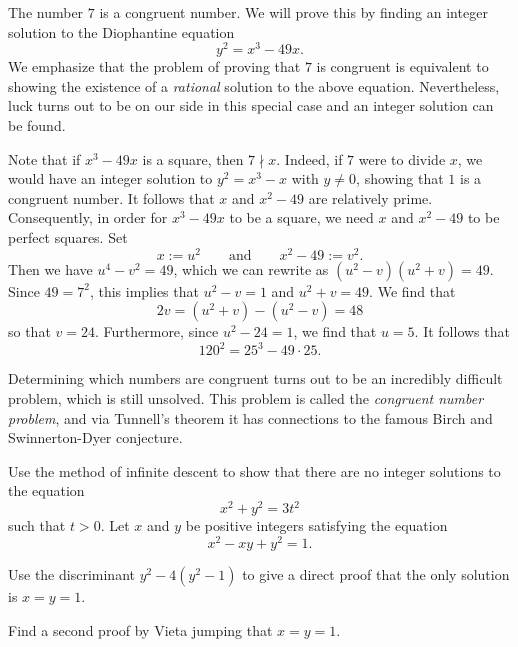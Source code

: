 \begin{example}
  The number $7$ is a congruent number. We will prove this by finding an integer solution to the Diophantine equation
  \begin{equation*}
    y^2=x^3-49x.
  \end{equation*}
  We emphasize that the problem of proving that $7$ is congruent is equivalent to showing the existence of a \emph{rational} solution to the above equation. Nevertheless, luck turns out to be on our side in this special case and an integer solution can be found.
  
  Note that if $x^3-49x$ is a square, then $7\nmid x$. Indeed, if $7$ were to divide $x$, we would have an integer solution to $y^2=x^3-x$ with $y\neq 0$, showing that $1$ is a congruent number. It follows that $x$ and $x^2-49$ are relatively prime. Consequently, in order for $x^3-49x$ to be a square, we need $x$ and $x^2-49$ to be perfect squares. Set
  \begin{equation*}
    x:=u^2\qquad\text{and}\qquad x^2-49 := v^2.
  \end{equation*}
  Then we have $u^4-v^2=49$, which we can rewrite as $(u^2-v)(u^2+v)=49$. Since $49=7^2$, this implies that $u^2-v=1$ and $u^2+v=49$. We find that
  \begin{equation*}
    2v=(u^2+v)-(u^2-v)=48
  \end{equation*}
  so that $v=24$. Furthermore, since $u^2-24=1$, we find that $u=5$. It follows that
  \begin{equation*}
    120^2=25^3-49\cdot 25.
  \end{equation*}
\end{example}

Determining which numbers are congruent turns out to be an incredibly difficult problem, which is still unsolved. This problem is called the \emph{congruent number problem}, and via Tunnell's theorem it has connections to the famous Birch and Swinnerton-Dyer conjecture.

\exercises

\begin{starter}
  \exercise Use the method of infinite descent to show that there are no integer solutions to the equation
  \begin{equation*}
    x^2+y^2=3t^2
  \end{equation*}
  such that $t>0$.
  \exercise Let $x$ and $y$ be positive integers satisfying the equation
  \begin{equation*}
    x^2-xy+y^2=1.
  \end{equation*}
  \begin{subexenum}
  \item Use the discriminant $y^2-4(y^2-1)$ to give a direct proof that the only solution is $x=y=1$.
  \item Find a second proof by Vieta jumping that $x=y=1$.
  \end{subexenum}
\end{starter}

